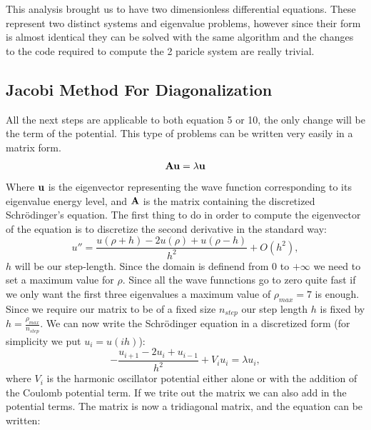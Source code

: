 \documentclass[10pt,a4paper,titlepage]{article}
\begin{document}
This analysis brought us to have two dimensionless differential equations. These represent two distinct systems and eigenvalue problems, however since 
their form is almost identical they can be solved with the same algorithm and the changes to the code required to compute the 2 paricle system are really
trivial.

\subsection*{Jacobi Method For Diagonalization}
All the next steps are applicable to both equation 5 or 10, the only change will be the term of the potential. This type of problems can be written very
easily in a matrix form. 
\[
{\bf Au } = \lambda {\bf u}
\]
Where ${\bf u }$ is the eigenvector representing the wave function corresponding to its eigenvalue energy level, and ${\bf A }$ is the matrix containing 
the discretized Schr\"odinger's equation. The first thing to do in order to compute the eigenvector of the equation is to discretize the second derivative
in the standard way:
\begin{equation}
    u''=\frac{u(\rho+h) -2u(\rho) +u(\rho-h)}{h^2} +O(h^2),
\end{equation} 
$h$ will be our step-length. Since the domain is definend from $0$ to $+\infty$ we need to set a maximum value for $\rho$. Since all the wave funnctions 
go to zero quite fast if we only want the first three eigenvalues a maximum value of $\rho_{max} = 7$ is enough. Since we require our matrix to be of a 
fixed size $n_{step}$ our step length  $h$ is fixed by $h=\frac{\rho_{max}}{n_{step}}$. 
We can now write the Schr\"odinger equation in a discretized form (for simplicity we put $u_i = u(ih)$):
\begin{equation}
-\frac{u_{i+1} -2u_i +u_{i-1} }{h^2}+V_iu_i  = \lambda u_i,
\end{equation}
where $V_i$ is the harmonic oscillator potential either alone or with the addition of the Coulomb potential term. If we trite out the matrix we can also 
add in the potential terms. The matrix is now a tridiagonal matrix, and the equation can be written:
\end{document}
